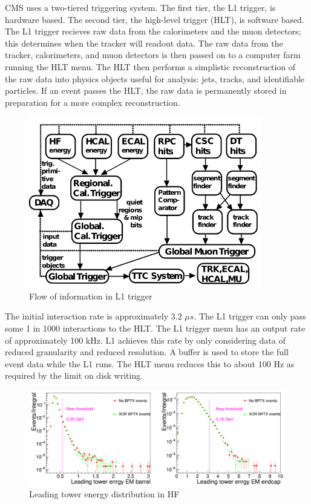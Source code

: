CMS uses a two-tiered triggering system. The first tier, the L1 trigger, is hardware based. The second tier, the high-level trigger (HLT), is software based. The L1 trigger recieves raw data from the calorimeters and the muon detectors; this determines when the tracker will readout data. The raw data from the tracker, calorimeters, and muon detectors is then passed on to a computer farm running the HLT menu. The HLT then performs a simplistic reconstruction of the raw data into physics objects useful for analysis: jets, tracks, and identifiable particles. If an event passes the HLT, the raw data is permanently stored in preparation for a more complex reconstruction. 

\begin{figure}[h!]
\begin{centering}
\includegraphics[width=4in]{Chapter5/importfigs/l1_trigger_flow.png}
\par\end{centering}
\caption{Flow of information in L1 trigger \label{fig:l1TriggerFlow}}
\end{figure}

The initial interaction rate is approximately $3.2$ $\mu s$. The L1 trigger can only pass some 1 in 1000 interactions to the HLT. The L1 trigger menu has an output rate of approximately 100 kHz. L1 achieves this rate by only considering data of reduced granularity and reduced resolution. A buffer is used to store the full event data while the L1 runs. The HLT menu reduces this to about 100 Hz as required by the limit on disk writing.

\begin{figure}[h!]
\begin{centering}
\includegraphics[width=6in]{Chapter5/importfigs/hf_max_tower.png}
\par\end{centering}
\caption{Leading tower energy distribution in HF \label{fig:hfMaxTower}}
\end{figure}

